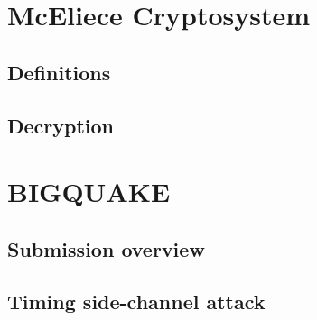 \section{McEliece Cryptosystem}
\subsection{Definitions}
\subsection{Decryption}
\section{BIGQUAKE}
\subsection{Submission overview}
\subsection{Timing side-channel attack}